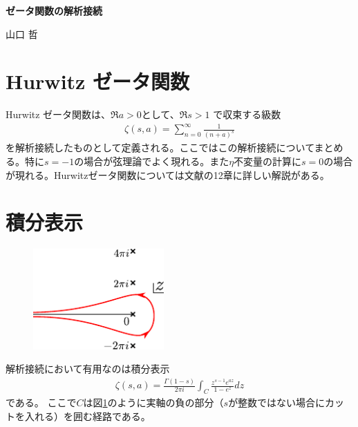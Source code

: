 \documentclass[12pt,a4paper,dvipdfmx]{jlreq}
\begin{document}
{\bfseries \LARGE ゼータ関数の解析接続}
\begin{flushright}
  山口 哲
\end{flushright}
\section{Hurwitz ゼータ関数}
Hurwitz ゼータ関数は、$\Re a>0$として、$\Re s>1$ で収束する級数
\begin{align}
  \zeta(s,a)=\sum_{n=0}^{\infty}\frac{1}{(n+a)^s}
  \label{zeta}
\end{align}
を解析接続したものとして定義される。ここではこの解析接続についてまとめる。特に$s=-1$の場合が弦理論でよく現れる。また$\eta$不変量の計算に$s=0$の場合が現れる。Hurwitzゼータ関数については文献\cite{Apostol}の12章に詳しい解説がある。
\section{積分表示}
\begin{figure}
  \centering
  \includegraphics[width=5cm]{path.pdf}
  \caption{}
  \label{fig:contour}
\end{figure}
解析接続において有用なのは積分表示
\begin{align}
  \zeta(s,a)=\frac{\Gamma(1-s)}{2\pi i}\int_C \frac{z^{s-1}e^{az}}{1-e^{z}}dz
\label{integral-representation}
\end{align}
である。
ここで$C$は図\ref{fig:contour}のように実軸の負の部分（$s$が整数ではない場合にカットを入れる）を囲む経路である。
\end{document}
